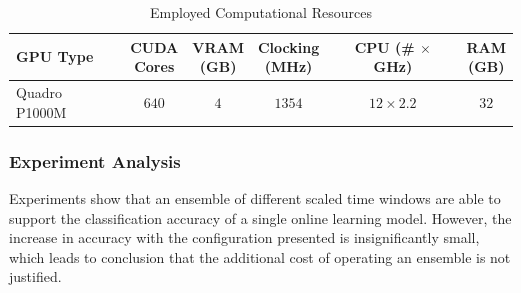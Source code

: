 \documentclass[conference]{IEEEtran}
\begin{document}
\begin{table}[b]
\centering
\caption{Employed Computational Resources}
\label{tab:resources}
\footnotesize
\centering
\setlength{\extrarowheight}{0pt}
\addtolength{\extrarowheight}{\aboverulesep}
\addtolength{\extrarowheight}{\belowrulesep}
\setlength{\aboverulesep}{0pt}
\setlength{\belowrulesep}{0pt}
\setlength{\extrarowheight}{.1em}
\begin{tabular}{lccccc}
\toprule
\textbf{GPU Type} & \makecell{\textbf{CUDA} \\ \textbf{Cores}} & \makecell{\textbf{VRAM} \\ (GB)}\textbf{} & \makecell{\textbf{Clocking} \\ (MHz)} & \makecell{\textbf{CPU} \\ (\# $\times$ GHz)} & \makecell{\textbf{RAM} \\ (GB)} \\ 
\midrule
\multicolumn{1}{l}{Quadro P1000M} & \multicolumn{1}{c}{$640$} & \multicolumn{1}{c}{$4$} & \multicolumn{1}{c}{$1354$} & \multicolumn{1}{c}{$12 \times 2.2$} & \multicolumn{1}{c}{$32$} \\
\bottomrule
\end{tabular}
\end{table}

\subsubsection{Experiment Analysis}

Experiments show that an ensemble of different scaled time windows are able to support the classification accuracy of a single online learning model. However, the increase in accuracy with the configuration presented is insignificantly small, which leads to conclusion that the additional cost of operating an ensemble is not justified. 
\end{document}
